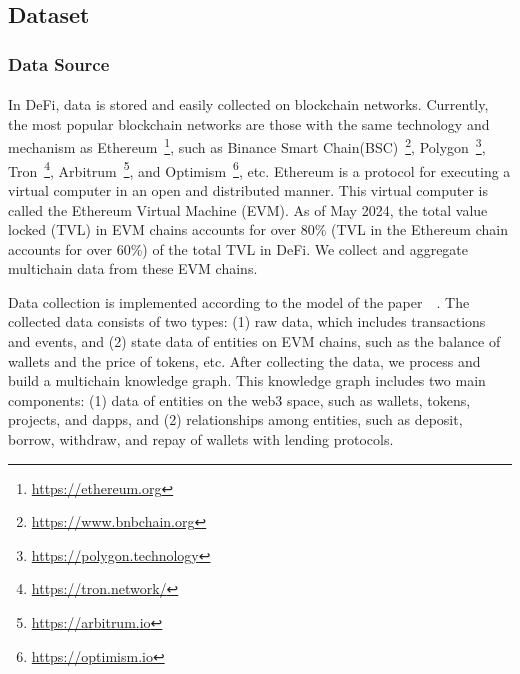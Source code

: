 \documentclass[../ICIT-Paper-2024.tex]{subfiles}
\begin{document}
\subsection{Dataset}

\subsubsection{Data Source}
\paragraph{}
In DeFi, data is stored and easily collected on blockchain networks. Currently, the most popular blockchain networks are those with the same technology and mechanism as Ethereum~\footnote{\href{https://ethereum.org/}{https://ethereum.org}}, such as Binance Smart Chain(BSC)~\footnote{\href{https://www.bnbchain.org/en/bnb-smart-chain}{https://www.bnbchain.org}}, Polygon~\footnote{\href{https://polygon.technology/}{https://polygon.technology}}, Tron~\footnote{\href{https://tron.network/}{https://tron.network/}}, Arbitrum~\footnote{\href{https://arbitrum.io/}{https://arbitrum.io}}, and Optimism~\footnote{\href{https://optimism.io/}{https://optimism.io}}, etc. Ethereum is a protocol for executing a virtual computer in an open and distributed manner. This virtual computer is called the Ethereum Virtual Machine (EVM). As of May 2024, the total value locked (TVL) in EVM chains accounts for over 80\% (TVL in the Ethereum chain accounts for over 60\%) of the total TVL in DeFi. We collect and aggregate multichain data from these EVM chains.

Data collection is implemented according to the model of the paper~\citeauthor{pham2022analysis}~\cite{pham2022analysis}. The collected data consists of two types: (1) raw data, which includes transactions and events, and (2) state data of entities on EVM chains, such as the balance of wallets and the price of tokens, etc. After collecting the data, we process and build a multichain knowledge graph. This knowledge graph includes two main components: (1) data of entities on the web3 space, such as wallets, tokens, projects, and dapps, and (2) relationships among entities, such as deposit, borrow, withdraw, and repay of wallets with lending protocols.
\end{document}
